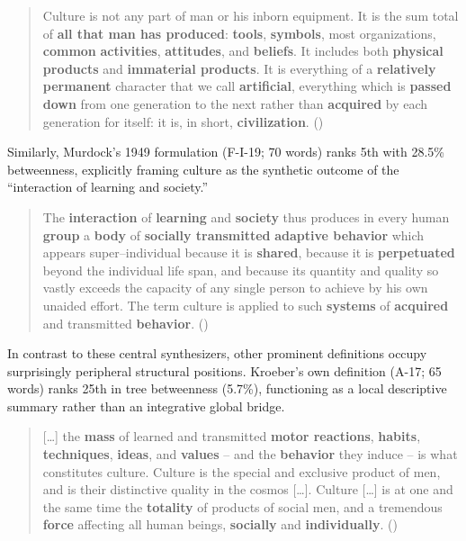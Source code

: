 \documentclass[11pt]{article}
\begin{document}
\begin{quotation}
Culture is not any part of man or his inborn equipment. It is the sum total of \textbf{all that man has produced}: \textbf{tools}, \textbf{symbols}, most organizations, \textbf{common} \textbf{activities}, \textbf{attitudes}, and \textbf{beliefs}. It includes both \textbf{physical products} and \textbf{immaterial products}. It is everything of a \textbf{relatively permanent} character that we call \textbf{artificial}, everything which is \textbf{passed down} from one generation to the next rather than \textbf{acquired} by each generation for itself: it is, in short, \textbf{civilization}. (\citealt{folsom1931})
\end{quotation}

Similarly, Murdock's 1949 formulation (F-I-19; 70 words) ranks 5th with 28.5\% betweenness, explicitly framing culture as the synthetic outcome of the ``interaction of learning and society.''

\begin{quotation}
The \textbf{interaction} of \textbf{learning} and \textbf{society} thus produces in every human \textbf{group} a \textbf{body} of \textbf{socially transmitted} \textbf{adaptive behavior} which appears super–individual because it is \textbf{shared}, because it is \textbf{perpetuated} beyond the individual life span, and because its quantity and quality so vastly exceeds the capacity of any single person to achieve by his own unaided effort. The term culture is applied to such \textbf{systems} of \textbf{acquired} and transmitted \textbf{behavior}. (\citealt{murdock1949a})
\end{quotation}

In contrast to these central synthesizers, other prominent definitions occupy surprisingly peripheral structural positions. Kroeber's own definition (A-17; 65 words) ranks 25th in tree betweenness (5.7\%), functioning as a local descriptive summary rather than an integrative global bridge.

\begin{quotation}
[\ldots] the \textbf{mass} of learned and transmitted \textbf{motor reactions}, \textbf{habits}, \textbf{techniques}, \textbf{ideas}, and \textbf{values} -- and the \textbf{behavior} they induce -- is what constitutes culture. Culture is the special and exclusive product of men, and is their distinctive quality in the cosmos [\ldots]. Culture [\ldots] is at one and the same time the \textbf{totality} of products of social men, and a tremendous \textbf{force} affecting all human beings, \textbf{socially} and \textbf{individually}. (\citealt{kroeber1948a})
\end{quotation}
\end{document}
